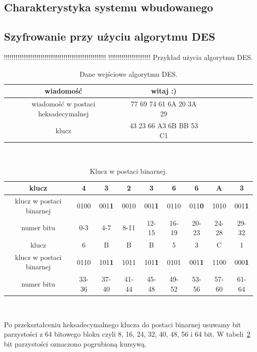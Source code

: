 \documentclass[12p]{article}
\begin{document}
\subsection{Charakterystyka systemu wbudowanego}
\subsection{Szyfrowanie przy użyciu algorytmu DES}

!!!!!!!!!!!!!!!!!!!!!!!!!!!!!!!!!!!!!!!!!!!!!!!!!!!!!
!!!!!!!!!!!!!!!!!!!!!!  Przykład użycia algorytmu DES.
 
\begin{table}[H]
\centering
\begin{tabular}{|c|c|c|c|c|c|c|c|c|}
\hline
wiadomość & witaj :)\\
\hline
wiadomość w postaci heksadecymalnej & 77 69 74 61 6A 20 3A 29\\
\hline
klucz & 43 23 66 A3 6B BB 53 C1\\
\hline
\end{tabular}
\caption{Dane wejściowe algorytmu DES.}~\label{binary}
\end{table}

\begin{table}[H]
\centering
\begin{tabular}{|c|c|c|c|c|c|c|c|c|}
\hline
klucz & 4 & 3 & 2 & 3 & 6 & 6 & A & 3\\
\hline
klucz w postaci binarnej & 0100 & 001\textbf{1} & 0010 & 001\textbf{1} & 0110 & 011\textbf{0} & 1010 & 001\textbf{1}\\ 
\hline
numer bitu & 0-3 & 4-7 & 8-11 & 12-15 & 16-19 & 20-23 & 24-28 & 29-32\\
\hline
\hline
klucz & 6 & B & B & B & 5 & 3 & C & 1\\
\hline
klucz w postaci binarnej & 0110 & 101\textbf{1} & 1011 & 101\textbf{1} & 0101 & 001\textbf{1} & 1100 & 000\textbf{1}\\
\hline
numer bitu & 33-36 & 37-40 & 41-44 & 45-48 & 49-52 & 53-56 & 57-60 & 61-64\\
\hline
\end{tabular}
\caption{Klucz w postaci binarnej.}~\label{klucz_to_binary}
\end{table}

Po przekształceniu heksadecymalnego klucza do postaci binarnej usuwamy bit parzystości z 64 bitowego bloku czyli 8, 16, 24, 32, 40, 48, 56 i 64 bit. W tabeli~\ref{klucz_to_binary} bit parzystości oznaczono pogrubioną kursywą.
\end{document}
